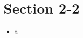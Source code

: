\documentclass[10pt]{article}
\begin{document}
\maketitle

\section{Section 2-2}

\begin{itemize}
\item t
\end{itemize}
\end{document}
